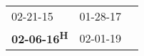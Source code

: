 \begin{supertabular}{lll}
           02-21-15\textsuperscript{} &  01-28-17\textsuperscript{} \\
 \textbf{02-06-16\textsuperscript{H}} &  02-01-19\textsuperscript{} \\
\end{supertabular}
